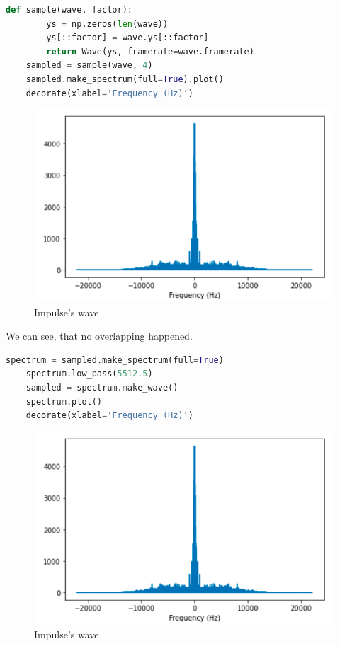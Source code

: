 \documentclass[a4paper]{article}
\begin{document}
        \begin{lstlisting}[language=Python,caption=Modulating the signal,label={lst:part1_2}]
    def sample(wave, factor):
        ys = np.zeros(len(wave))
        ys[::factor] = wave.ys[::factor]
        return Wave(ys, framerate=wave.framerate)
    sampled = sample(wave, 4)
    sampled.make_spectrum(full=True).plot()
    decorate(xlabel='Frequency (Hz)')
        \end{lstlisting}
        
        \begin{figure}[H]
            \centering
            \includegraphics[width=\textwidth]{img/p2_1.png}
            \caption{Impulse's wave}
            \label{fig:part1_1_2}
        \end{figure}
        
        We can see, that no overlapping happened.
        
        
        \begin{lstlisting}[language=Python,caption=Getting modulated,label={lst:part1_2}]
    spectrum = sampled.make_spectrum(full=True)
    spectrum.low_pass(5512.5)
    sampled = spectrum.make_wave()
    spectrum.plot()
    decorate(xlabel='Frequency (Hz)')
        \end{lstlisting}
        
        \begin{figure}[H]
            \centering
            \includegraphics[width=\textwidth]{img/p2_1.png}
            \caption{Impulse's wave}
            \label{fig:part1_1_2}
        \end{figure}
        
\end{document}

